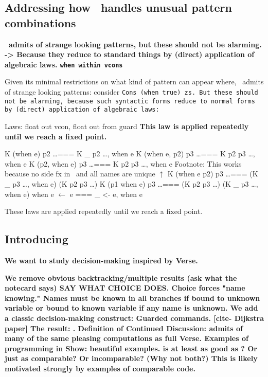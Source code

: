 \documentclass[manuscript,screen,review, 12pt]{acmart}
\begin{document}
\begin{outline}[enumerate]
    
\subsection{Addressing how \PPlus\ handles unusual pattern combinations}
\2 \bf{\PPlus\ admits of strange looking patterns, but these should not be alarming. }
\2 \bf{-> Because they reduce to standard things by (direct) application of algebraic laws. }
\3 \bf{\tt{when} within vcons }

    Given its minimal restrictions on what kind of pattern can appear where,
    \PPlus\ admits of strange looking patterns: consider \tt{Cons (when true)
    zs}. But these should not be alarming, because such syntactic forms reduce
    to normal forms by (direct) application of algebraic laws: 

    
        \3 Laws: float out vcon, float out from guard
        \3 \bf{This law is applied repeatedly until we reach a fixed point.}

        \3 K (when e) p2 \dots === K \_ p2 \dots, when e
        \3 K (when e, p2) p3 \dots  === K p2 p3 \dots, when e
        \3 K (p2, when e) p3 \dots  === K p2 p3 \dots, when e
        \3 Footnote: This works because no side fx in \PPlus\ and all names are unique $\uparrow$ 
        \3 K (when e \pbar p2) p3 \dots === (K \_ p3 \dots, when e) \pbar (K p2 p3 \dots)
        \3 K (p1 \pbar when e) p3 \dots === (K p2 p3 \dots) \pbar (K \_ p3 \dots, when e) 
        \3 when e $\leftarrow$ e === \_ <- e, when e

        
        These laws are applied repeatedly until we reach a fixed point. 
        
\subsection{Introducing \VMinus\ }
\1 \bf{We want to study decision-making inspired by Verse. }
        
        \2 \bf{We remove obvious backtracking/multiple results (ask what the notecard says)}
        SAY WHAT CHOICE DOES. 
        \bf{Choice forces "name knowing." Names must be known in all branches 
        if bound to unknown variable or bound to known variable if any name 
        is unknown}.
        \2 \bf{We add a classic decision-making construct: Guarded commands. }
        [cite- Dijkstra paper]
        \2 \bf{The result: \VMinus. }
    \1 \bf{Definition of \VMinus}
    \1 \bf{Continued Discussion:}
    \2 \bf{{\VMinus} admits of many of the same pleasing computations as full Verse. }
    \2 \bf{Examples of programming in \VMinus }
    \3 \bf{Show: beautiful examples. }
    \2 \bf{{\VMinus} is at least as good as {\PPlus}? Or just as comparable? }
        Or incomparable? (Why not both?)
    \3 \bf{\bf{This is likely motivated strongly by examples of comparable code.}}
    \end{outline}
\end{document}
